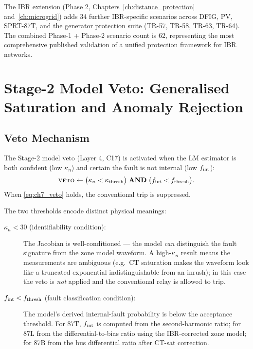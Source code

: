 The IBR extension (Phase 2, Chapters~\ref{ch:distance_protection}
and~\ref{ch:microgrid}) adds 34 further IBR-specific scenarios across
DFIG, PV, SPRT-87T, and the generator protection suite (TR-57, TR-58,
TR-63, TR-64).  The combined Phase-1 + Phase-2 scenario count is 62,
representing the most comprehensive published validation of a unified
protection framework for IBR networks.

\section{Stage-2 Model Veto: Generalised Saturation and Anomaly Rejection}
\label{sec:ch7_stage2}

\subsection{Veto Mechanism}

The Stage-2 model veto (Layer 4, C17) is activated when the LM estimator
is both confident (low $\kappa_n$) and certain the fault is not internal
(low $f_{\rm int}$):
\begin{equation}
  \textsc{veto} \leftarrow \bigl(\kappa_n < \kappa_{\rm thresh}\bigr)
    \;\mathbf{AND}\;
    \bigl(f_{\rm int} < f_{\rm thresh}\bigr).
  \label{eq:ch7_veto}
\end{equation}
When \eqref{eq:ch7_veto} holds, the conventional trip is suppressed.

The two thresholds encode distinct physical meanings:
\begin{description}
  \item[$\kappa_n < 30$ (identifiability condition):] The Jacobian is
    well-conditioned — the model \emph{can} distinguish the fault signature
    from the zone model waveform.  A high-$\kappa_n$ result means the
    measurements are ambiguous (e.g.\ CT saturation makes the waveform
    look like a truncated exponential indistinguishable from an inrush);
    in this case the veto is \emph{not} applied and the conventional relay
    is allowed to trip.
  \item[$f_{\rm int} < f_{\rm thresh}$ (fault classification condition):] The
    model's derived internal-fault probability is below the acceptance
    threshold.  For 87T, $f_{\rm int}$ is computed from the second-harmonic
    ratio; for 87L from the differential-to-bias ratio using the IBR-corrected
    zone model; for 87B from the bus differential ratio after CT-sat correction.
\end{description}

